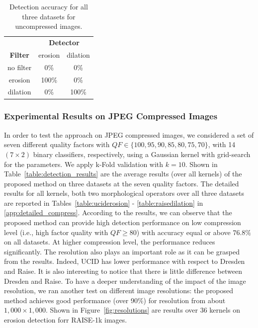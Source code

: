 \documentclass[review]{elsarticle}
\begin{document}
\begin{table}[!ht]
	\centering
	\caption{Detection accuracy for all three datasets for uncompressed images.}
	\label{tab1:det_acc}
	\begin{tabular}{|l|l|l}
		\hline\hline%
		\multicolumn{1}{c|}{}		     & \multicolumn{2}{c}{\textbf{Detector}}	           				    \\ 
		\cline{2-3}
		\multicolumn{1}{c|}{\textbf{Filter}}    & \multicolumn{1}{c|}{erosion} & \multicolumn{1}{c}{dilation} \\ 
		\hline%
		\multicolumn{1}{c|}{no filter} & \multicolumn{1}{c|}{0\%} 	& \multicolumn{1}{c}{0\%}      \\ \hline
		\multicolumn{1}{c|}{erosion}   & \multicolumn{1}{c|}{100\%}   & \multicolumn{1}{c}{0\%}      \\ \hline
		\multicolumn{1}{c|}{dilation}  & \multicolumn{1}{c|}{0\%}     & \multicolumn{1}{c}{100\%}    \\ 
		\hline\hline
	\end{tabular}
\end{table}

\subsubsection{Experimental Results on JPEG Compressed Images}
%
In order to test the approach on JPEG compressed images, we considered a set of seven different quality factors with $QF \in \{100,95,90,85,80,75,70\}$, with 14 $(7\times 2)$ binary classifiers, respectively,
using a Gaussian kernel with grid-search for the parameters. We apply k-Fold validation with $k = 10$. Shown in Table~\ref{table:detection_results} are the average results (over all kernels) of the proposed method on three datasets at the seven quality factors. The detailed results for all kernels, both two morphological operators over all three datasets are reported in Tables~\ref{table:uciderosion} - \ref{table:raisedilation} in \ref{app:detailed_compress}. According to the results, we can observe that the proposed method can provide high detection performance on low compression level (i.e., high factor quality with $QF \ge 80$) with accuracy equal or above $76.8\%$ on all datasets. At higher compression level, the performance reduces significantly. The resolution also plays an important role as it can be grasped from the results. Indeed, UCID has lower performance with respect to Dresden and Raise. It is also interesting to notice that there is little difference between Dresden and Raise. To have a deeper understanding of the impact of the image resolution, we ran another test on different image resolutions: the proposed method achieves good performance (over 90\%) for resolution from about $1,000 \times 1,000$. Shown in Figure~\ref{fig:resolutions} are results over 36 kernels on erosion detection forr RAISE-1k images.%
\end{document}
